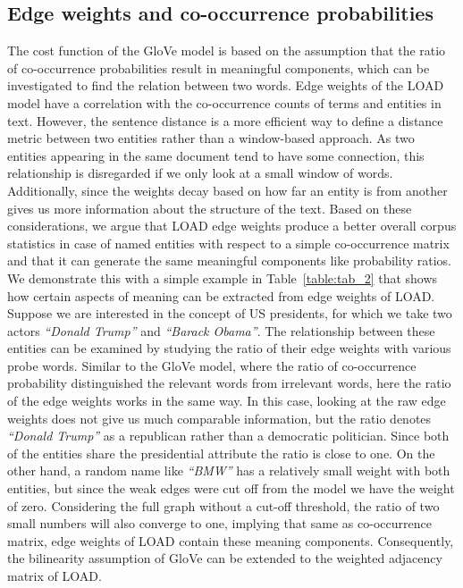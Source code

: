 \subsection{Edge weights and co-occurrence probabilities}\label{subsec:weights_load}
The cost function of the GloVe model is based on the assumption that the ratio of co-occurrence probabilities result in meaningful components, which can be investigated to find the relation between two words. Edge weights of the LOAD model have a correlation with the co-occurrence counts of terms and entities in text. However, the sentence distance is a more efficient way to define a distance metric between two entities rather than a window-based approach. As two entities appearing in the same document tend to have some connection, this relationship is disregarded if we only look at a small window of words. Additionally, since the weights decay based on how far an entity is from another gives us more information about the structure of the text. Based on these considerations, we argue that LOAD edge weights produce a better overall corpus statistics in case of named entities with respect to a simple co-occurrence matrix and that it can generate the same meaningful components like probability ratios. \\
We demonstrate this with a simple example in Table~\ref{table:tab_2} that shows how certain aspects of meaning can be extracted from edge weights of LOAD. Suppose we are interested in the concept of US presidents, for which we take two actors \emph{``Donald Trump''} and \emph{``Barack Obama''}. The relationship between these entities can be examined by studying the ratio of their edge weights with various probe words. Similar to the GloVe model, where the ratio of co-occurrence probability distinguished the relevant words from irrelevant words, here the ratio of the edge weights works in the same way. In this case, looking at the raw edge weights does not give us much comparable information, but the ratio denotes \emph{``Donald Trump''} as a republican rather than a democratic politician. Since both of the entities share the presidential attribute the ratio is close to one. On the other hand, a random name like \emph{``BMW''} has a relatively small weight with both entities, but since the weak edges were cut off from the model we have the weight of zero. Considering the full graph without a cut-off threshold, the ratio of two small numbers will also converge to one, implying that same as co-occurrence matrix, edge weights of LOAD contain these meaning components. Consequently, the bilinearity assumption of GloVe can be extended to the weighted adjacency matrix of LOAD. 
